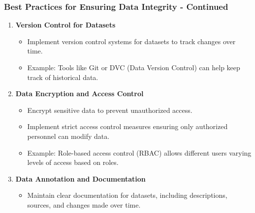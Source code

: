 \documentclass{beamer}
\begin{document}
\begin{frame}[fragile]
    \frametitle{Best Practices for Ensuring Data Integrity - Continued}
    \begin{enumerate}[resume]
        \item \textbf{Version Control for Datasets}
        \begin{itemize}
            \item Implement version control systems for datasets to track changes over time.
            \item Example: Tools like Git or DVC (Data Version Control) can help keep track of historical data.
        \end{itemize}
        
        \item \textbf{Data Encryption and Access Control}
        \begin{itemize}
            \item Encrypt sensitive data to prevent unauthorized access.
            \item Implement strict access control measures ensuring only authorized personnel can modify data. 
            \item Example: Role-based access control (RBAC) allows different users varying levels of access based on roles.
        \end{itemize}

        \item \textbf{Data Annotation and Documentation}
        \begin{itemize}
            \item Maintain clear documentation for datasets, including descriptions, sources, and changes made over time.
        \end{itemize}

    \end{enumerate}
\end{frame}
\end{document}

